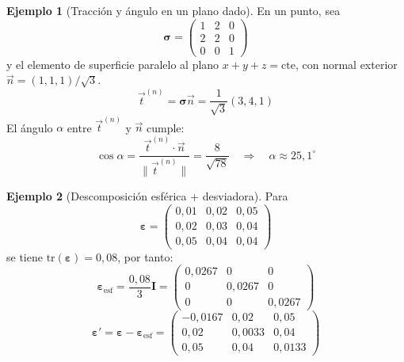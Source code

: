 \documentclass[12pt, a4paper]{article}
\theoremstyle{plain}
\theoremstyle{definition}
\newtheorem{ejemplo}{Ejemplo}[section]
\theoremstyle{remark}
\newcommand{\ve}[1]{\vec{#1}}
\begin{document}
\begin{ejemplo}[Tracción y ángulo en un plano dado]
En un punto, sea
\begin{equation}
  \boldsymbol{\sigma}=
  \begin{pmatrix}
    1 & 2 & 0\\
    2 & 2 & 0\\
    0 & 0 & 1
  \end{pmatrix}
\end{equation}
y el elemento de superficie paralelo al plano $x+y+z=\text{cte}$, con normal exterior
$\ve{n}=(1,1,1)/\sqrt{3}$.
\begin{equation}
  \ve{t}^{(n)}=\boldsymbol{\sigma}\ve{n}
  =\frac{1}{\sqrt{3}}(3,4,1)
\end{equation}
El ángulo $\alpha$ entre $\ve{t}^{(n)}$ y $\ve{n}$ cumple:
\begin{equation}
  \cos\alpha=\frac{\ve{t}^{(n)}\cdot\ve{n}}{\|\ve{t}^{(n)}\|}
  =\frac{8}{\sqrt{78}}
  \quad\Rightarrow\quad
  \alpha\approx 25{,}1^\circ
\end{equation}
\end{ejemplo}

\begin{ejemplo}[Descomposición esférica + desviadora]
Para
\begin{equation}
  \boldsymbol{\varepsilon}=
  \begin{pmatrix}
    0{,}01 & 0{,}02 & 0{,}05\\
    0{,}02 & 0{,}03 & 0{,}04\\
    0{,}05 & 0{,}04 & 0{,}04
  \end{pmatrix}
\end{equation}
se tiene $\mathrm{tr}(\boldsymbol{\varepsilon})=0{,}08$, por tanto:
\begin{equation}
  \boldsymbol{\varepsilon}_{\mathrm{esf}}
  =\frac{0{,}08}{3}\mathbf{I}
  =\begin{pmatrix}
    0{,}0267 & 0 & 0\\
    0 & 0{,}0267 & 0\\
    0 & 0 & 0{,}0267
  \end{pmatrix}
\end{equation}
\begin{equation}
  \boldsymbol{\varepsilon}'=\boldsymbol{\varepsilon}
  -\boldsymbol{\varepsilon}_{\mathrm{esf}}
  =\begin{pmatrix}
    -0{,}0167 & 0{,}02 & 0{,}05\\
    0{,}02 & 0{,}0033 & 0{,}04\\
    0{,}05 & 0{,}04 & 0{,}0133
  \end{pmatrix}
\end{equation}
\end{ejemplo}
\end{document}
